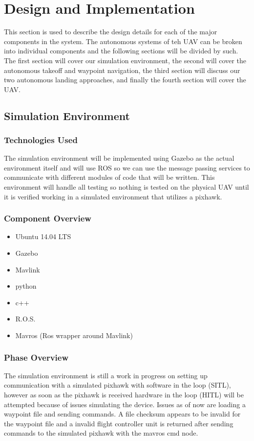 
\chapter{Design  and Implementation}
This section is used to describe the design details for each of the major components in the system. The autonomous systems of teh UAV can be broken into individual components and the following sections will be divided by such. The first section will cover our simulation environment, the second will cover the autonomous takeoff and waypoint navigation, the third section will discuss our two autonomous landing approaches, and finally the fourth section will cover the UAV.      

\section{Simulation Environment}
\subsection{Technologies  Used}
The simulation environment will be implemented using Gazebo as the actual environment itself and will use ROS so we can use the message passing services to communicate with different modules of code that will be written. This environment will handle all testing so nothing is tested on the physical UAV until it is verified working in a simulated environment that utilizes a pixhawk.
\subsection{Component  Overview}
\begin{itemize}
  \item Ubuntu 14.04 LTS
  \item Gazebo
  \item Mavlink
  \item python
  \item c++
  \item R.O.S.
  \item Mavros (Ros wrapper around Mavlink)
\end{itemize}
\subsection{Phase Overview}
The simulation environment is still a work in progress on setting up communication with a simulated pixhawk with software in the loop (SITL), however as soon as the pixhawk is received hardware in the loop (HITL) will be attempted because of issues simulating the device. Issues as of now are loading a waypoint file and sending commands. A file checksum appears to be invalid for the waypoint file and a invalid flight controller unit is returned after sending commands to the simulated pixhawk with the mavros cmd node.
